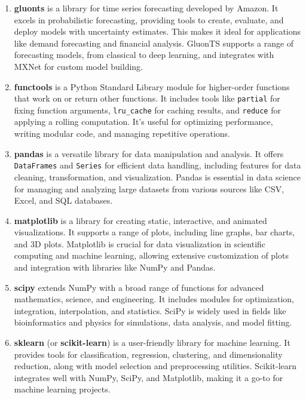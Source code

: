 \begin{enumerate}
    \item \textbf{gluonts} is a library for time series forecasting developed by Amazon. It excels in probabilistic forecasting, providing tools to create, evaluate, and deploy models with uncertainty estimates. This makes it ideal for applications like demand forecasting and financial analysis. GluonTS supports a range of forecasting models, from classical to deep learning, and integrates with MXNet for custom model building.
    
    \item \textbf{functools} is a Python Standard Library module for higher-order functions that work on or return other functions. It includes tools like \texttt{partial} for fixing function arguments, \texttt{lru\_cache} for caching results, and \texttt{reduce} for applying a rolling computation. It's useful for optimizing performance, writing modular code, and managing repetitive operations.
    
    \item \textbf{pandas} is a versatile library for data manipulation and analysis. It offers \texttt{DataFrames} and \texttt{Series} for efficient data handling, including features for data cleaning, transformation, and visualization. Pandas is essential in data science for managing and analyzing large datasets from various sources like CSV, Excel, and SQL databases.
    
    \item \textbf{matplotlib} is a library for creating static, interactive, and animated visualizations. It supports a range of plots, including line graphs, bar charts, and 3D plots. Matplotlib is crucial for data visualization in scientific computing and machine learning, allowing extensive customization of plots and integration with libraries like NumPy and Pandas.
    
    \item \textbf{scipy} extends NumPy with a broad range of functions for advanced mathematics, science, and engineering. It includes modules for optimization, integration, interpolation, and statistics. SciPy is widely used in fields like bioinformatics and physics for simulations, data analysis, and model fitting.
    
    \item \textbf{sklearn} (or \textbf{scikit-learn}) is a user-friendly library for machine learning. It provides tools for classification, regression, clustering, and dimensionality reduction, along with model selection and preprocessing utilities. Scikit-learn integrates well with NumPy, SciPy, and Matplotlib, making it a go-to for machine learning projects.
    

\end{enumerate}
